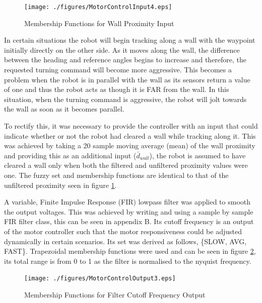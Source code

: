 \documentclass[10pt]{article}
\begin{document}
\begin{figure}[H]
    \centering
\texttt{[image: ./figures/MotorControlInput4.eps]}
\caption{Membership Functions for Wall Proximity Input}
\label{fig:wallProx}
\end{figure}

In certain situations the robot will begin tracking along a wall with the waypoint initially directly on the other side. 
As it moves along the wall, the difference between the heading and reference angles begins to increase and therefore, the requested turning command will become more aggressive. 
This becomes a problem when the robot is in parallel with the wall as its sensors return a value of one and thus the robot acts as though it is FAR from the wall.
In this situation, when the turning command is aggressive, the robot will jolt towards the wall as soon as it becomes parallel. 

\medskip
To rectify this, it was necessary to provide the controller with an input that could indicate whether or not the robot had cleared a wall while tracking along it. 
This was achieved by taking a 20 sample moving average (mean) of the wall proximity and providing this as an additional input ($\bar{d}_{wall}$), the robot is assumed to have cleared a wall only when both the filtered and unfiltered proximity values were one.
The fuzzy set and membership functions are identical to that of the unfiltered proximity seen in figure \ref{fig:wallProx}.

\medskip
A variable, Finite Impulse Response (FIR) lowpass filter was applied to smooth the output voltages.
This was achieved by writing and using a sample by sample FIR filter class, this can be seen in appendix B.
Its cutoff frequency is an output of the motor controller such that the motor responsiveness could be adjusted dynamically in certain scenarios.
Its set was derived as follows, \{SLOW, AVG, FAST\}.
Trapezoidal membership functions were used and can be seen in figure \ref{fig:filterOut}, its total range is from 0 to 1 as the filter is normalised to the nyquist frequency. 



\begin{figure}[H]
    \centering
\texttt{[image: ./figures/MotorControlOutput3.eps]}
\caption{Membership Functions for Filter Cutoff Frequency Output}
\label{fig:filterOut}
\end{figure}
\end{document}
